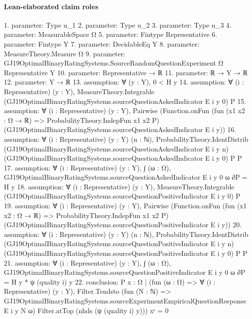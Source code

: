 \documentclass[10pt]{article}
\begin{document}
\paragraph{Lean-elaborated claim roles}\begin{ReviewVerbatim}
1. parameter: Type u_1
2. parameter: Type u_2
3. parameter: Type u_3
4. parameter: MeasurableSpace Ω
5. parameter: Fintype Representative
6. parameter: Fintype Y
7. parameter: DecidableEq Y
8. parameter: MeasureTheory.Measure Ω
9. parameter: GJ19OptimalBinaryRatingSystems.SourceRandomQuestionExperiment Ω Representative Y
10. parameter: Representative → ℝ
11. parameter: ℝ → Y → ℝ
12. parameter: Y → ℝ
13. assumption: ∀ (y : Y), 0 < H y
14. assumption: ∀ (i : Representative) (y : Y),
  MeasureTheory.Integrable (GJ19OptimalBinaryRatingSystems.sourceQuestionAskedIndicator E i y 0) P
15. assumption: ∀ (i : Representative) (y : Y),
  Pairwise
    (Function.onFun (fun (x1 x2 : Ω → ℝ) => ProbabilityTheory.IndepFun x1 x2 P)
      (GJ19OptimalBinaryRatingSystems.sourceQuestionAskedIndicator E i y))
16. assumption: ∀ (i : Representative) (y : Y) (n : ℕ),
  ProbabilityTheory.IdentDistrib (GJ19OptimalBinaryRatingSystems.sourceQuestionAskedIndicator E i y n)
    (GJ19OptimalBinaryRatingSystems.sourceQuestionAskedIndicator E i y 0) P P
17. assumption: ∀ (i : Representative) (y : Y),
  ∫ (ω : Ω), GJ19OptimalBinaryRatingSystems.sourceQuestionAskedIndicator E i y 0 ω ∂P = H y
18. assumption: ∀ (i : Representative) (y : Y),
  MeasureTheory.Integrable (GJ19OptimalBinaryRatingSystems.sourceQuestionPositiveIndicator E i y 0) P
19. assumption: ∀ (i : Representative) (y : Y),
  Pairwise
    (Function.onFun (fun (x1 x2 : Ω → ℝ) => ProbabilityTheory.IndepFun x1 x2 P)
      (GJ19OptimalBinaryRatingSystems.sourceQuestionPositiveIndicator E i y))
20. assumption: ∀ (i : Representative) (y : Y) (n : ℕ),
  ProbabilityTheory.IdentDistrib (GJ19OptimalBinaryRatingSystems.sourceQuestionPositiveIndicator E i y n)
    (GJ19OptimalBinaryRatingSystems.sourceQuestionPositiveIndicator E i y 0) P P
21. assumption: ∀ (i : Representative) (y : Y),
  ∫ (ω : Ω), GJ19OptimalBinaryRatingSystems.sourceQuestionPositiveIndicator E i y 0 ω ∂P = H y * ψ (quality i) y
22. conclusion: P
    {x : Ω |
        (fun (ω : Ω) =>
            ∀ (i : Representative) (y : Y),
              Filter.Tendsto
                (fun (N : ℕ) => GJ19OptimalBinaryRatingSystems.sourceExperimentEmpiricalQuestionResponse E i y N ω)
                Filter.atTop (nhds (ψ (quality i) y)))
          x}ᶜ =
  0
\end{ReviewVerbatim}
\end{document}
